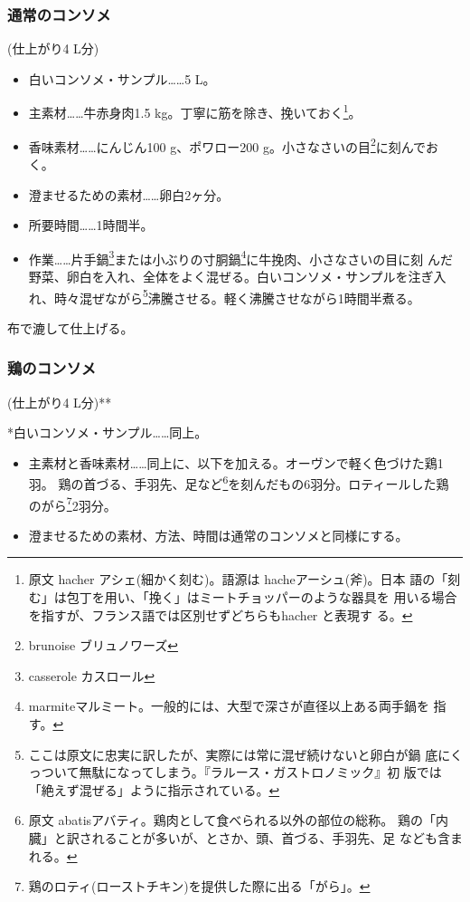 
\hypertarget{ux901aux5e38ux306eux30b3ux30f3ux30bdux30e1}{%
\subsubsection{通常のコンソメ}\label{ux901aux5e38ux306eux30b3ux30f3ux30bdux30e1}}

(仕上がり4 L分)

\begin{itemize}
\item
  白いコンソメ・サンプル\ldots{}\ldots{}5 L。
\item
  主素材\ldots{}\ldots{}牛赤身肉1.5
  kg。丁寧に筋を除き、挽いておく\footnote{原文 hacher
    アシェ(細かく刻む)。語源は hacheアーシュ(斧)。日本
    語の「刻む」は包丁を用い、「挽く」はミートチョッパーのような器具を
    用いる場合を指すが、フランス語では区別せずどちらもhacher と表現す
    る。}。
\item
  香味素材\ldots{}\ldots{}にんじん100 g、ポワロー200
  g。小さなさいの目\footnote{brunoise ブリュノワーズ}に刻んでおく。
\item
  澄ませるための素材\ldots{}\ldots{}卵白2ヶ分。
\item
  所要時間\ldots{}\ldots{}1時間半。
\item
  作業\ldots{}\ldots{}片手鍋\footnote{casserole カスロール}または小ぶりの寸胴鍋\footnote{marmiteマルミート。一般的には、大型で深さが直径以上ある両手鍋を
    指す。}に牛挽肉、小さなさいの目に刻
  んだ野菜、卵白を入れ、全体をよく混ぜる。白いコンソメ・サンプルを注ぎ入
  れ、時々混ぜながら\footnote{ここは原文に忠実に訳したが、実際には常に混ぜ続けないと卵白が鍋
    底にくっついて無駄になってしまう。『ラルース・ガストロノミック』初
    版では「絶えず混ぜる」ように指示されている。}沸騰させる。軽く沸騰させながら1時間半煮る。
\end{itemize}

布で漉して仕上げる。

\hypertarget{ux9d8fux306eux30b3ux30f3ux30bdux30e1}{%
\subsubsection{鶏のコンソメ}\label{ux9d8fux306eux30b3ux30f3ux30bdux30e1}}

(仕上がり4 L分)**

*白いコンソメ・サンプル\ldots{}\ldots{}同上。

\begin{itemize}
\item
  主素材と香味素材\ldots{}\ldots{}同上に、以下を加える。オーヴンで軽く色づけた鶏1羽。
  鶏の首づる、手羽先、足など\footnote{原文
    abatisアバティ。鶏肉として食べられる以外の部位の総称。
    鶏の「内臓」と訳されることが多いが、とさか、頭、首づる、手羽先、足
    なども含まれる。}を刻んだもの6羽分。ロティールした鶏
  のがら\footnote{鶏のロティ(ローストチキン)を提供した際に出る「がら」。}2羽分。
\item
  澄ませるための素材、方法、時間は通常のコンソメと同様にする。
\end{itemize}
